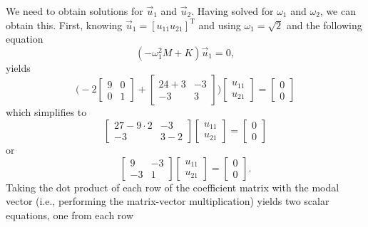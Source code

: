 \documentclass[12pt,letter]{article}
\begin{document}
\begin{example}
We need to obtain solutions for $\vec{u}_1$ and $\vec{u}_2$. Having solved for $\omega_1$ and $\omega_2$, we can obtain this. First, knowing $\vec{u}_1 = [u_{11} u_{21}]^\text{T}$ and using $\omega_1 = \sqrt{2}$ and the following equation
\begin{equation}
 (-\omega_1^2 M  + K)\vec{u}_1 =0,
\end{equation}
yields 
\begin{equation}
 \bigg(-2\begin{bmatrix} 9 & 0 \\   0  & 1 \end{bmatrix} + \begin{bmatrix} 24+3 & -3 \\    -3  & 3 \end{bmatrix}\bigg)\begin{bmatrix} u_{11}\\ u_{21}\end{bmatrix} = \begin{bmatrix} 0\\ 0\end{bmatrix}
\end{equation}
which simplifies to
\begin{equation}
 \begin{bmatrix} 27-9\cdot 2 & -3 \\    -3  & 3-2 \end{bmatrix} 
 \begin{bmatrix} u_{11}\\ u_{21}\end{bmatrix}=\begin{bmatrix} 0\\ 0\end{bmatrix}
\end{equation}
or
\begin{equation}
 \begin{bmatrix} 9 & -3 \\    -3  & 1 \end{bmatrix} 
 \begin{bmatrix} u_{11}\\ u_{21}\end{bmatrix}=\begin{bmatrix} 0\\ 0\end{bmatrix}.
\end{equation}
Taking the dot product of each row of the coefficient matrix with the modal vector (i.e., performing the matrix-vector multiplication) yields two scalar equations, one from each row

\end{example}
\end{document}
